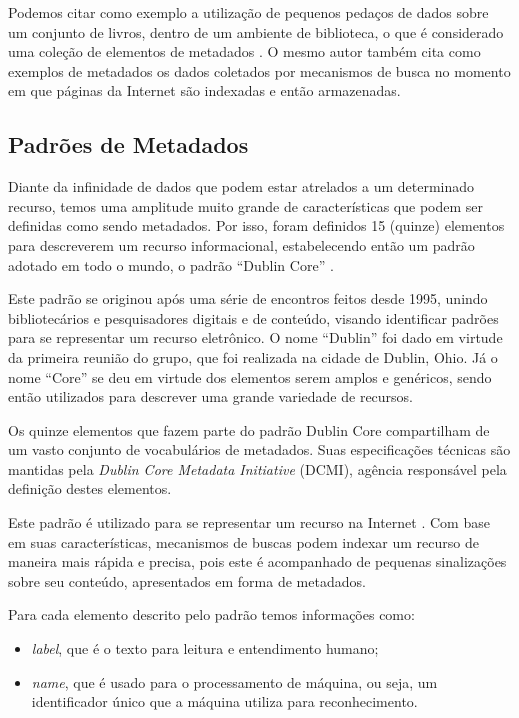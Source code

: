 Podemos citar como exemplo a utilização de pequenos pedaços de dados sobre um conjunto de livros, dentro de um ambiente de biblioteca, o que é considerado uma coleção de elementos de metadados \cite{meta-dados}. O mesmo autor também cita como exemplos de metadados os dados coletados por mecanismos de busca no momento em que páginas da Internet são indexadas e então armazenadas.

\subsection{Padrões de Metadados}
\label{ssec:metadata-patterns}

Diante da infinidade de dados que podem estar atrelados a um determinado recurso, temos uma amplitude muito grande de características que podem ser definidas como sendo metadados. Por isso, foram definidos 15 (quinze) elementos para descreverem um recurso informacional, estabelecendo então um padrão adotado em todo o mundo, o padrão ``Dublin Core'' \cite{dublin-core}.

Este padrão se originou após uma série de encontros feitos desde 1995, unindo bibliotecários e pesquisadores digitais e de conteúdo, visando identificar padrões para se representar um recurso eletrônico. O nome ``Dublin'' foi dado em virtude da primeira reunião do grupo, que foi realizada na cidade de Dublin, Ohio. Já o nome ``Core'' se deu em virtude dos elementos serem amplos e genéricos, sendo então utilizados para descrever uma grande variedade de recursos.

Os quinze elementos que fazem parte do padrão Dublin Core compartilham de um vasto conjunto de vocabulários de metadados. Suas especificações técnicas são mantidas pela \emph{Dublin Core Metadata Initiative} (DCMI), agência responsável pela definição destes elementos.

Este padrão é utilizado para se representar um recurso na Internet \cite{dublin-core-1-1}. Com base em suas características, mecanismos de buscas podem indexar um recurso de maneira mais rápida e precisa, pois este é acompanhado de pequenas sinalizações sobre seu conteúdo, apresentados em forma de metadados. 

Para cada elemento descrito pelo padrão temos informações como: 

\begin{itemize}
    \item \textit{label}, que é o texto para leitura e entendimento humano;
    \item \textit{name}, que é usado para o processamento de máquina, ou seja, um identificador único que a máquina utiliza para reconhecimento.
\end{itemize}


